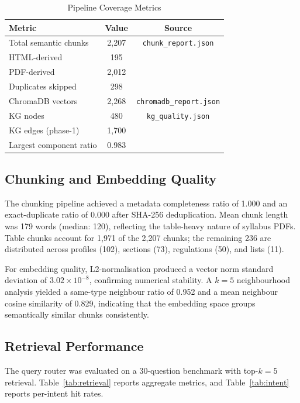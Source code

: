 \documentclass{ieeeaccess}
\begin{document}
\begin{table}[H]
\centering
\begin{tabular}{lcc}
\toprule
\textbf{Metric} & \textbf{Value} & \textbf{Source} \\
\midrule
Total semantic chunks   & 2,207 & \texttt{chunk\_report.json} \\
HTML-derived            & 195   & \\
PDF-derived             & 2,012 & \\
Duplicates skipped      & 298   & \\
ChromaDB vectors        & 2,268 & \texttt{chromadb\_report.json} \\
KG nodes                & 480   & \texttt{kg\_quality.json} \\
KG edges (phase-1)      & 1,700 & \\
Largest component ratio & 0.983 & \\
\bottomrule
\end{tabular}
\caption{Pipeline Coverage Metrics}
\label{tab:coverage}
\end{table}

\subsection{Chunking and Embedding Quality}
The chunking pipeline achieved a metadata completeness ratio of 1.000 and an exact-duplicate ratio of 0.000 after SHA-256 deduplication. Mean chunk length was 179 words (median: 120), reflecting the table-heavy nature of syllabus PDFs. Table chunks account for 1,971 of the 2,207 chunks; the remaining 236 are distributed across profiles (102), sections (73), regulations (50), and lists (11).

For embedding quality, L2-normalisation produced a vector norm standard deviation of $3.02\times10^{-8}$, confirming numerical stability. A $k{=}5$ neighbourhood analysis yielded a same-type neighbour ratio of 0.952 and a mean neighbour cosine similarity of 0.829, indicating that the embedding space groups semantically similar chunks consistently.

\subsection{Retrieval Performance}
The query router was evaluated on a 30-question benchmark with top-$k{=}5$ retrieval. Table~\ref{tab:retrieval} reports aggregate metrics, and Table~\ref{tab:intent} reports per-intent hit rates.
\end{document}
